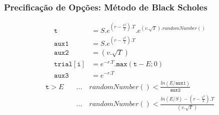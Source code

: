 \documentclass{beamer}
\begin{document}
\begin{frame}

\frametitle{Precificação de Opções: Método de Black Scholes}
	
\begin{equation}
	\begin{aligned}
		\mathtt{t}			&= S.e^{(r-\frac{v^2}{2}).T}.e^{(v.\sqrt{T}).randomNumber()}\\
		\mathtt{aux1}		&= S.e^{(r-\frac{v^2}{2}).T}\\
		\mathtt{aux2}		&= (v.\sqrt{T})\\
		\mathtt{trial[i]}	&= e^{-r.T}.\mathtt{max}(\mathtt{t}-E;0)\\
		\mathtt{aux3}		&= e^{-r.T}
	\end{aligned}
\end{equation}
\begin{equation}
	\begin{aligned}
	\mathtt{t}>E \quad &... \quad randomNumber() < \frac{ln(E/\mathtt{aux1})}{\mathtt{aux2}}\\
					   &... \quad randomNumber() < \frac{ln(E/S) - (r-\frac{v^2}{2}).T}{(v.\sqrt{T})}\\
	\end{aligned}
\end{equation}

\end{frame}
	
\end{document}
